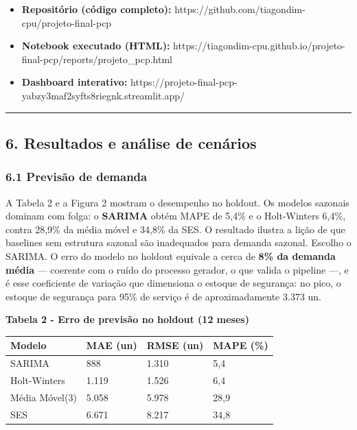 \documentclass[
  brazilian,
  12pt,
]{article}
\newcounter{none} %
\providecommand{\tightlist}{%
  \setlength{\itemsep}{0pt}\setlength{\parskip}{0pt}}
\begin{document}
\begin{itemize}
\tightlist
\item
  \textbf{Repositório (código completo):}
  https://github.com/tiagondim-cpu/projeto-final-pcp
\item
  \textbf{Notebook executado (HTML):}
  https://tiagondim-cpu.github.io/projeto-final-pcp/reports/projeto\_pcp.html
\item
  \textbf{Dashboard interativo:}
  https://projeto-final-pcp-yabzy3maf2syfts8riegnk.streamlit.app/
\end{itemize}

\begin{center}\rule{0.5\linewidth}{0.5pt}\end{center}

\subsection{6. Resultados e análise de
cenários}\label{resultados-e-anuxe1lise-de-cenuxe1rios}

\subsubsection{6.1 Previsão de demanda}\label{previsuxe3o-de-demanda-1}

A Tabela 2 e a Figura 2 mostram o desempenho no holdout. Os modelos
sazonais dominam com folga: o \textbf{SARIMA} obtém MAPE de 5,4\% e o
Holt-Winters 6,4\%, contra 28,9\% da média móvel e 34,8\% da SES. O
resultado ilustra a lição de que baselines sem estrutura sazonal são
inadequados para demanda sazonal. Escolho o SARIMA. O erro do modelo no
holdout equivale a cerca de \textbf{8\% da demanda média} --- coerente
com o ruído do processo gerador, o que valida o pipeline ---, e é esse
coeficiente de variação que dimensiona o estoque de segurança: no pico,
o estoque de segurança para 95\% de serviço é de aproximadamente 3.373
un.

\textbf{Tabela 2 - Erro de previsão no holdout (12 meses)}

{\def\LTcaptype{none} %
\begin{longtable}[]{@{}llll@{}}
\toprule\noalign{}
Modelo & MAE (un) & RMSE (un) & MAPE (\%) \\
\midrule\noalign{}
\endhead
\bottomrule\noalign{}
\endlastfoot
SARIMA & 888 & 1.310 & 5,4 \\
Holt-Winters & 1.119 & 1.526 & 6,4 \\
Média Móvel(3) & 5.058 & 5.978 & 28,9 \\
SES & 6.671 & 8.217 & 34,8 \\
\end{longtable}
}
\end{document}
